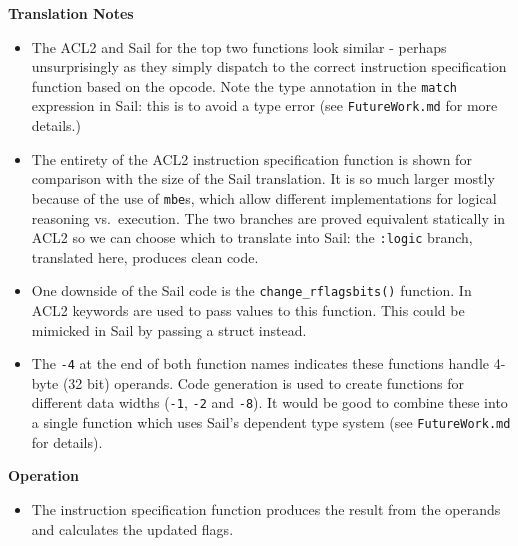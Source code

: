 \documentclass[a4paper]{article}
\begin{document}
\begin{tcolorbox}[breakable]
\textbf{Translation Notes}

\begin{itemize}
  \item The ACL2 and Sail for the top two functions look similar - perhaps unsurprisingly as they simply dispatch to the correct instruction specification function based on the opcode.  Note the type annotation in the \texttt{match} expression in Sail: this is to avoid a type error (see \texttt{FutureWork.md} for more details.)

  \item The entirety of the ACL2 instruction specification function is shown for comparison with the size of the Sail translation.  It is so much larger mostly because of the use of \texttt{mbe}s, which allow different implementations for logical reasoning vs.~execution.  The two branches are proved equivalent statically in ACL2 so we can choose which to translate into Sail: the \texttt{:logic} branch, translated here, produces clean code.

  \item One downside of the Sail code is the \texttt{change\_rflagsbits()} function.  In ACL2 keywords are used to pass values to this function.  This could be mimicked in Sail by passing a struct instead.

  \item The \texttt{-4} at the end of both function names indicates these functions handle 4-byte (32 bit) operands.  Code generation is used to create functions for different data widths (\texttt{-1}, \texttt{-2} and \texttt{-8}).  It would be good to combine these into a single function which uses Sail's dependent type system (see \texttt{FutureWork.md} for details).
\end{itemize}

\textbf{Operation}
\begin{itemize}
  \item The instruction specification function produces the result from the operands and calculates the updated flags.
\end{itemize}

\end{tcolorbox}
\end{document}
